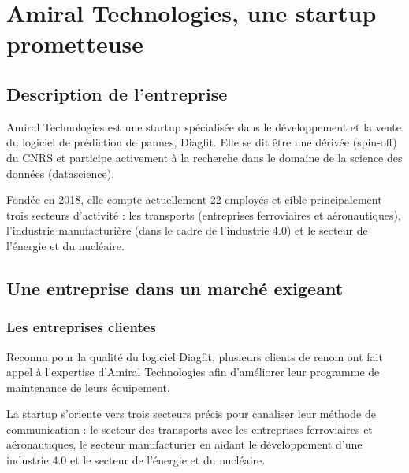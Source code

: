 \section{Amiral Technologies, une startup prometteuse}
\subsection{Description de l'entreprise}
Amiral Technologies est une startup spécialisée dans le développement et la vente du logiciel de prédiction de pannes, Diagfit. Elle se dit être une dérivée (spin-off) du CNRS et participe activement à la recherche dans le domaine de la science des données (datascience).

Fondée en 2018, elle compte actuellement 22 employés et cible principalement trois secteurs d'activité : les transports (entreprises ferroviaires et aéronautiques), l'industrie manufacturière (dans le cadre de l'industrie 4.0) et le secteur de l'énergie et du nucléaire.

\subsection{Une entreprise dans un marché exigeant}
\subsubsection{Les entreprises clientes}
Reconnu pour la qualité du logiciel Diagfit, plusieurs clients de renom ont fait appel à l’expertise d’Amiral Technologies afin d'améliorer leur programme de maintenance de leurs équipement.

La startup s'oriente vers trois secteurs précis pour canaliser leur méthode de communication : le secteur des transports avec les entreprises ferroviaires et aéronautiques, le secteur manufacturier en aidant le développement d'une industrie 4.0 et le secteur de l'énergie et du nucléaire.

